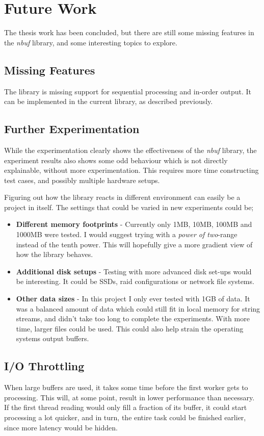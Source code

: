\documentclass[a4paper]{article}
\newcommand{\nbuf}{\textit{nbuf} }
\begin{document}
\newpage
\section{Future Work}
The thesis work has been concluded, but there are still some missing features in the \nbuf library, and some interesting topics to explore. 

\subsection{Missing Features}
The library is missing support for sequential processing and in-order output. It can be implemented in the current library, as described previously.


\subsection{Further Experimentation}
While the experimentation clearly shows the effectiveness of the \nbuf library, the experiment results also shows some odd behaviour which is not directly explainable, without more experimentation. This requires more time constructing test cases, and possibly multiple hardware setups.

Figuring out how the library reacts in different environment can easily be a project in itself. The settings that could be varied in new experiments could be;

\begin{itemize}
\item \textbf{Different memory footprints} - Currently only 1MB, 10MB, 100MB and 1000MB were tested. I would suggest trying with a \textit{power of two}-range instead of the tenth power. This will hopefully give a more gradient view of how the library behaves.
\item \textbf{Additional disk setups} - Testing with more advanced disk set-ups would be interesting. It could be SSDs, raid configurations or network file systems.
\item \textbf{Other data sizes} - In this project I only ever tested with 1GB of data. It was a balanced amount of data which could still fit in local memory for string streams, and didn't take too long to complete the experiments. With more time, larger files could be used. This could also help strain the operating systems output buffers.
\end{itemize}


\subsection{I/O Throttling}
When large buffers are used, it takes some time before the first worker gets to processing. This will, at some point, result in lower performance than necessary. If the first thread reading would only fill a fraction of its buffer, it could start processing a lot quicker, and in turn, the entire task could be finished earlier, since more latency would be hidden.\\
\end{document}
